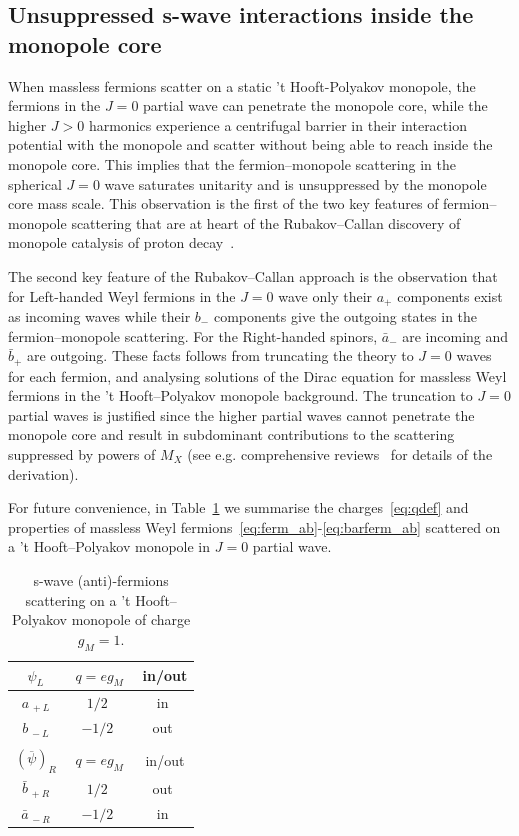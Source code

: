 \documentclass[a4paper,11pt]{article}
\begin{document}
\subsection{Unsuppressed s-wave interactions inside the monopole core}
\label{sec:2.1}
\medskip


When massless fermions scatter on a static 't Hooft-Polyakov monopole, the fermions in the $J=0$ partial wave can penetrate the monopole core, while the higher $J>0$  harmonics experience a centrifugal barrier in their interaction potential with the monopole and scatter without being able to reach inside the monopole core. 
This implies that the fermion--monopole scattering in the spherical $J=0$ wave saturates unitarity and
 is unsuppressed by the monopole core mass scale. This observation is the first of the two key features of fermion--monopole scattering that are at heart of the 
 Rubakov--Callan  discovery of monopole catalysis of proton decay~\cite{Rubakov:1981rg,Callan:1982ah,Callan:1982au}.

The second key feature of the Rubakov--Callan approach is the observation that for Left-handed Weyl fermions in the $J=0$ wave only their $a_{+}$ components exist as incoming waves while their $b_{-}$ components give the outgoing states in the fermion--monopole scattering. For the Right-handed spinors, $\bar{a}_{-}$ are incoming and $\bar{b}_{+}$ are outgoing. These facts follows from truncating the theory to $J=0$ waves for each fermion, 
and analysing solutions of the Dirac equation for massless Weyl fermions in the 't Hooft--Polyakov monopole background. The truncation to $J=0$ partial waves
is justified since the higher partial waves cannot penetrate the monopole core and result in subdominant contributions to the scattering suppressed by powers of $M_X$
 (see e.g. comprehensive  reviews~\cite{Rubakov:1988aq,Callan:1983tm,Preskill:1984gd} for details of the derivation).

\medskip 

For future convenience, in Table~\ref{Tab:1} we summarise the charges~\eqref{eq:qdef} and properties of massless Weyl fermions~\eqref{eq:ferm_ab}-\eqref{eq:barferm_ab}
scattered on a 't Hooft--Polyakov monopole in $J=0$ partial wave.
 \begin{table}[ht]
\centering
\begin{tabular}{c  c c}
\hline\hline
$\psi_L$ & $\,\,q=eg_M$ & \,\,in/out  \\ [0.5ex] 
\hline
$a_{\,+L}$  & $1/2$ &{in} \\
$b_{\,-L}$  & $-1/2$ & {out} \\
[1ex]   
\hline\\
\hline\hline
$(\overline{\psi})_{R}$ & $\,\,q=eg_M$ & \,\,in/out \\ [0.5ex] 
\hline
 $\bar{b}_{\,+R}$ & $1/2$ &out \\
 $\bar{a}_{\,-R}$ & $-1/2$ &in \\
[1ex]   
\end{tabular}
\caption{s-wave (anti)-fermions scattering on a 't Hooft--Polyakov monopole of charge $g_M=1$.}
\label{Tab:1}
\end{table}
\end{document}
